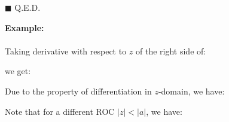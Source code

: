 \begin{itemize}
\begin{dem}
		\begin{flushright}
			$\blacksquare$  Q.E.D.
		\end{flushright}
		\end{dem}
		\begin{tcolorbox}[colframe=black,colback=white,sharp corners]
		\textbf{{\Large {}}Example:}\\\\
		Taking derivative with respect to $z$ of the right side of:
		
		we get:
		
		Due to the  property of differentiation in $z$-domain, we have:
		
		Note that for a different ROC $|z|<|a|$, we have:
		
		\end{tcolorbox} 
	\end{itemize}
	

